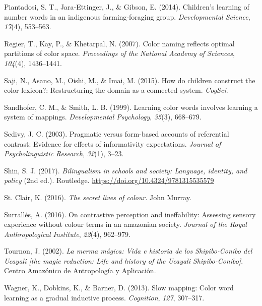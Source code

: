 \documentclass[
  ,apa7,floatsintext]{apa6}
\newlength{\cslhangindent}
\newlength{\cslentryspacingunit} %
\newenvironment{CSLReferences}[2] %
 {%
  \setlength{\parindent}{0pt}
  \ifodd #1
  \let\oldpar\par
  \def\par{\hangindent=\cslhangindent\oldpar}
  \fi
  \setlength{\parskip}{#2\cslentryspacingunit}
 }%
 {}
\begin{document}
\begin{CSLReferences}{1}{0}
\leavevmode{}%
Piantadosi, S. T., Jara‐Ettinger, J., \& Gibson, E. (2014). Children's learning of number words in an indigenous farming‐foraging group. \emph{Developmental Science}, \emph{17}(4), 553--563.

\leavevmode{}%
Regier, T., Kay, P., \& Khetarpal, N. (2007). Color naming reflects optimal partitions of color space. \emph{Proceedings of the National Academy of Sciences}, \emph{104}(4), 1436--1441.

\leavevmode{}%
Saji, N., Asano, M., Oishi, M., \& Imai, M. (2015). How do children construct the color lexicon?: Restructuring the domain as a connected system. \emph{CogSci}.

\leavevmode{}%
Sandhofer, C. M., \& Smith, L. B. (1999). Learning color words involves learning a system of mappings. \emph{Developmental Psychology}, \emph{35}(3), 668--679.

\leavevmode{}%
Sedivy, J. C. (2003). Pragmatic versus form-based accounts of referential contrast: Evidence for effects of informativity expectations. \emph{Journal of Psycholinguistic Research}, \emph{32}(1), 3--23.

\leavevmode{}%
Shin, S. J. (2017). \emph{Bilingualism in schools and society: Language, identity, and policy} (2nd ed.). Routledge. \url{https://doi.org/10.4324/9781315535579}

\leavevmode{}%
St. Clair, K. (2016). \emph{The secret lives of colour}. John Murray.

\leavevmode{}%
Surrallés, A. (2016). On contrastive perception and ineffability: Assessing sensory experience without colour terms in an amazonian society. \emph{Journal of the Royal Anthropological Institute}, \emph{22}(4), 962--979.

\leavevmode{}%
Tournon, J. (2002). \emph{La merma m{á}gica: Vida e historia de los {S}hipibo-{C}onibo del {U}cayali {[}the magic reduction: Life and history of the {U}cayali {S}hipibo-{C}onibo{]}}. Centro Amaz{ó}nico de Antropolog{í}a y Aplicaci{ó}n.

\leavevmode{}%
Wagner, K., Dobkins, K., \& Barner, D. (2013). Slow mapping: Color word learning as a gradual inductive process. \emph{Cognition}, \emph{127}, 307--317.


\end{CSLReferences}
\end{document}
